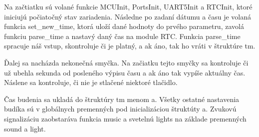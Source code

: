 \documentclass{article}
\begin{document}
Na začtiatku sú volané funkcie MCUInit, PortsInit, UART5Init a RTCInit, ktoré iniciujú počiatočný stav zariadenia. Následne po zadaní dátumu a času je volaná funkcia set\_new\_time, ktorá uloží  dané hodnoty do prvého parametru, zavolá funkciu parse\_time a nastavý daný čas na module RTC. Funkcia parse\_time spracuje náš vstup, skontroluje či je platný, a ak áno, tak ho vráti v štruktúre tm. 

Ďalej sa nacházda nekonečná smyčka. Na začiatku tejto smyčky sa kontroluje či už ubehla sekunda od posleného výpisu času a ak áno tak vypíše aktuálny čas. Náslene sa kontroluje, či nie je stlačené niektoré tlačidlo. 

Čas budenia sa ukladá do štruktúry tm menom a. Všetky ostatné nastavenia budíka sú v globálnych premenných pod inicializáciou štruktúty a. Zvukovú signalizáciu zaobstaráva funkcia music a svetelnú lights na základe premenných sound a light.
\end{document}
